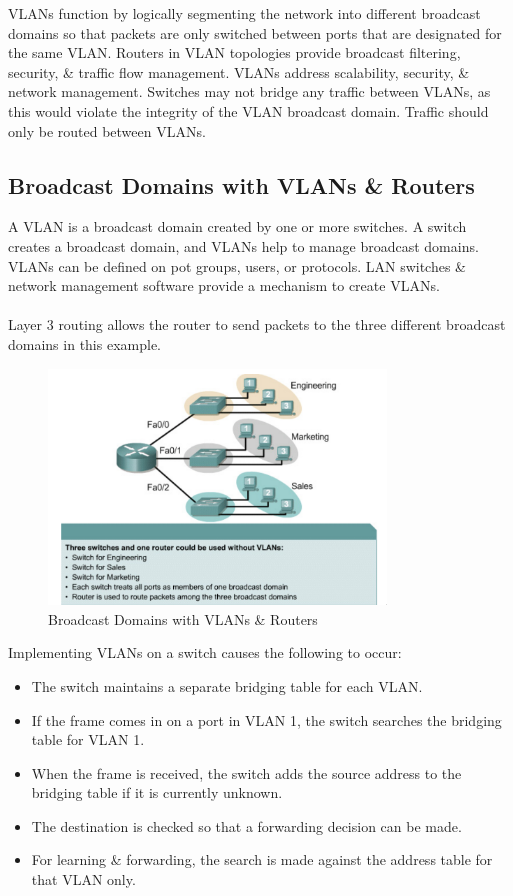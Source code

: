 \documentclass[a4paper,11pt]{article}
\begin{document}
VLANs function by logically segmenting the network into different broadcast domains so that packets are only switched between 
ports that are designated for the same VLAN. 
Routers in VLAN topologies provide broadcast filtering, security, \& traffic flow management. 
VLANs address scalability, security, \& network management. 
Switches may not bridge any traffic between VLANs, as this would violate the integrity of the VLAN broadcast domain. 
Traffic should only be routed between VLANs.

\subsection{Broadcast Domains with VLANs \& Routers}
A VLAN is a broadcast domain created by one or more switches. 
A switch creates a broadcast domain, and VLANs help to manage broadcast domains. 
VLANs can be defined on pot groups, users, or protocols. 
LAN switches \& network management software provide a mechanism to create VLANs. 
\\\\ 
Layer 3 routing allows the router to send packets to the three different broadcast domains in this example. 
\begin{figure}[H]
    \centering
    \includegraphics[width=0.8\textwidth]{./images/layer3_vlan.png}
    \caption{Broadcast Domains with VLANs \& Routers}
\end{figure}

Implementing VLANs on a switch causes the following to occur:
\begin{itemize}
    \item   The switch maintains a separate bridging table for each VLAN. 
    \item   If the frame comes in on a port in VLAN 1, the switch searches the bridging table for VLAN 1. 
    \item   When the frame is received, the switch adds the source address to the bridging table if it is currently 
            unknown.
    \item   The destination is checked so that a forwarding decision can be made. 
    \item   For learning \& forwarding, the search is made against the address table for that VLAN only.
\end{itemize}
\end{document}
